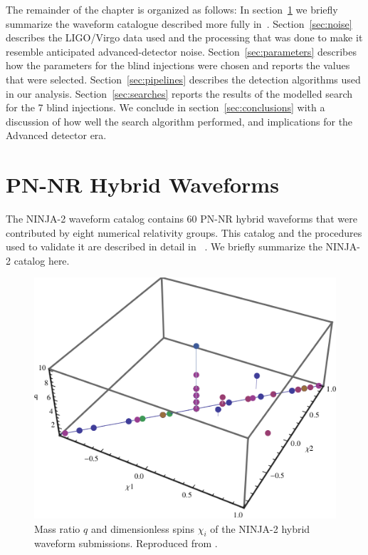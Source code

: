 The remainder of the chapter is organized as follows:
In section~\ref{sec:waveforms} we briefly summarize the waveform
catalogue described more fully in~\cite{Ajith:2012az}.
Section~\ref{sec:noise} describes the LIGO/Virgo data used and the
processing that was done to make it resemble anticipated
advanced-detector noise.  Section~\ref{sec:parameters} describes how
the parameters for the blind injections were chosen and reports the values 
that were selected.
Section~\ref{sec:pipelines} describes the detection algorithms used in 
our analysis.
Section~\ref{sec:searches} reports the results of the modelled 
search for the 7 blind injections.  
We conclude in section~\ref{sec:conclusions} with a discussion of 
how well the search algorithm performed, and implications for the
Advanced detector era.


\section{PN-NR Hybrid Waveforms}
\label{sec:waveforms}

The NINJA-2 waveform catalog contains 60 PN-NR hybrid waveforms that 
were contributed by eight numerical relativity groups.  This catalog and the 
procedures used to validate it are described in detail in
~\cite{Ajith:2012az}. We briefly summarize the NINJA-2 catalog 
here.

\begin{figure} 
\centerline{\includegraphics[width=0.95\linewidth]
{papers/mdc2013_submission/figure1.png}}
  \caption[Parameters of the NINJA-2 submissions]{
  \label{fig:ParameterSpace}
Mass ratio $q$ and dimensionless spins $\chi_i$ of the NINJA-2 hybrid
waveform submissions. Reproduced from \cite{Ajith:2012az}.
}
\end{figure}

